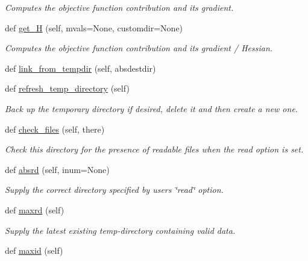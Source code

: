 \begin{DoxyCompactItemize}
\begin{DoxyCompactList}\small\item\em Computes the objective function contribution and its gradient. \end{DoxyCompactList}\item 
def \hyperlink{classsrc_1_1target_1_1Target_adae73b394ec5a1c22fe57d90265de537}{get\+\_\+H} (self, mvals=None, customdir=None)
\begin{DoxyCompactList}\small\item\em Computes the objective function contribution and its gradient / Hessian. \end{DoxyCompactList}\item 
def \hyperlink{classsrc_1_1target_1_1Target_a558b52b23367b475a553567cd3ab5a8f}{link\+\_\+from\+\_\+tempdir} (self, absdestdir)
\item 
def \hyperlink{classsrc_1_1target_1_1Target_ad8126429a9b72dff627da96934cd7f5c}{refresh\+\_\+temp\+\_\+directory} (self)
\begin{DoxyCompactList}\small\item\em Back up the temporary directory if desired, delete it and then create a new one. \end{DoxyCompactList}\item 
def \hyperlink{classsrc_1_1target_1_1Target_ab38c76271f96279624e9981bc365a082}{check\+\_\+files} (self, there)
\begin{DoxyCompactList}\small\item\em Check this directory for the presence of readable files when the \textquotesingle{}read\textquotesingle{} option is set. \end{DoxyCompactList}\item 
def \hyperlink{classsrc_1_1target_1_1Target_ad4a6e0bee35444a8b2c8bc124aac3c46}{absrd} (self, inum=None)
\begin{DoxyCompactList}\small\item\em Supply the correct directory specified by user\textquotesingle{}s \char`\"{}read\char`\"{} option. \end{DoxyCompactList}\item 
def \hyperlink{classsrc_1_1target_1_1Target_ac295603ea071c6b6db55b7c2cf89890a}{maxrd} (self)
\begin{DoxyCompactList}\small\item\em Supply the latest existing temp-\/directory containing valid data. \end{DoxyCompactList}\item 
def \hyperlink{classsrc_1_1target_1_1Target_a9517cd2799579d5fa5aa407fc79fff44}{maxid} (self)

\end{DoxyCompactItemize}
